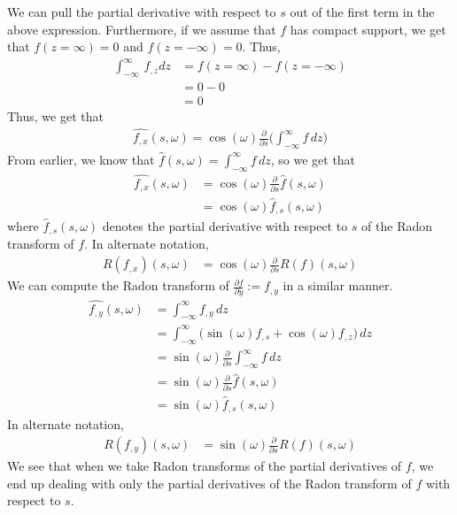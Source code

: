 \documentclass[12pt]{article}
\begin{document}
We can pull the partial derivative with respect to $s$ out of the first term in the above expression.
Furthermore, if we assume that $f$ has compact support, we get that $f(z = \infty) = 0$ and $f(z = -\infty) = 0$.
Thus,
\begin{align*}
	\int_{-\infty}^{\infty} \, f_{, z} dz & = f(z = \infty) - f(z = -\infty) \\
									   & = 0 - 0 \\
									   & = 0
\end{align*}
Thus, we get that
\begin{align*}
	\widehat{f_{, x}}(s, \omega) = \cos (\omega) \frac{\partial}{\partial s} \Bigg( \int_{-\infty}^{\infty} f \, dz \Bigg)
\end{align*}
From earlier, we know that $\hat{f}(s, \omega) = \int_{-\infty}^{\infty} f \, dz$, so we get that
\begin{align*}
	\widehat{f_{, x}}(s, \omega) & = \cos (\omega) \frac{\partial}{\partial s} \hat{f} (s, \omega) \\
								 & = \cos (\omega) \hat{f}_{, s} (s, \omega)
\end{align*}
where $\hat{f}_{, s} (s, \omega)$ denotes the partial derivative with respect to $s$ of the Radon transform of $f$.
In alternate notation,
\begin{align*}
	R(f_{, x}) (s, \omega) & = \cos (\omega) \frac{\partial}{\partial s} R(f) (s, \omega)
\end{align*}
We can compute the Radon transform of $\frac{\partial f}{\partial y} := f_{, y}$ in a similar manner.
\begin{align*}
	\widehat{f_{, y}}(s, \omega) & = \int_{-\infty}^{\infty} f_{, y} \, dz \\
								 & = \int_{-\infty}^{\infty} \Big( \sin(\omega) f_{, s} + \cos (\omega) f_{, z} \Big) \, dz \\
								 & = \sin (\omega) \frac{\partial}{\partial s} \int_{-\infty}^{\infty} f \, dz \\
								 & = \sin(\omega) \frac{\partial}{\partial s} \hat{f} (s, \omega) \\
								 & = \sin (\omega) \hat{f}_{, s} (s, \omega)
\end{align*}
In alternate notation,
\begin{align*}
	R(f_{, y}) (s, \omega) & = \sin (\omega) \frac{\partial}{\partial s} R(f) (s, \omega)
\end{align*}
We see that when we take Radon transforms of the partial derivatives of $f$, we end up dealing with only the partial derivatives of the Radon transform of $f$ with respect to $s$.
\end{document}
